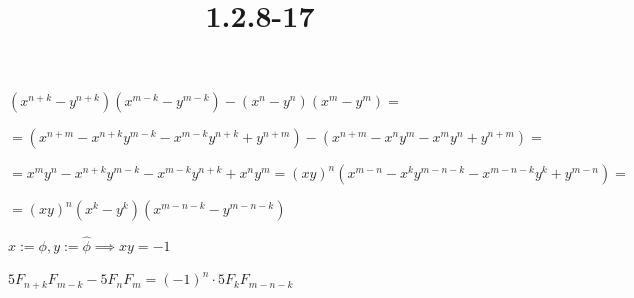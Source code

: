 \documentclass{article}
\title{1.2.8-17}
\begin{document}
\maketitle

$(x^{n+k} - y^{n+k})(x^{m-k} - y^{m-k}) -(x^{n} - y^{n})(x^{m} - y^{m}) =$

$= (x^{n+m}-x^{n+k}y^{m-k}-x^{m-k}y^{n+k}+y^{n+m}) - (x^{n+m}-x^{n}y^{m}-x^{m}y^{n}+y^{n+m}) =$

$= x^{m}y^{n} - x^{n+k}y^{m-k} - x^{m-k}y^{n+k} + x^ny^m = (xy)^n (x^{m-n} - x^ky^{m-n-k} -x^{m-n-k}y^k + y^{m-n}) =$

$= (xy)^n(x^{k}-y^k)(x^{m-n-k} - y^{m-n-k})$

$x := \phi, y := \hat\phi \implies xy = -1$

$5F_{n+k}F_{m-k} - 5F_nF_m = (-1)^n \cdot 5F_{k}F_{m-n-k}$
\end{document}
